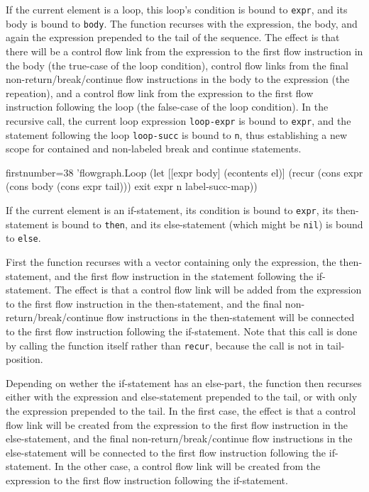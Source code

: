 \documentclass[11pt]{article}
\begin{document}
If the current element is a loop, this loop's condition is bound to
\verb|expr|, and its body is bound to \verb|body|.  The function recurses with
the expression, the body, and again the expression prepended to the tail of the
sequence.  The effect is that there will be a control flow link from the
expression to the first flow instruction in the body (the true-case of the loop
condition), control flow links from the final non-return/break/continue flow
instructions in the body to the expression (the repeation), and a control flow
link from the expression to the first flow instruction following the loop (the
false-case of the loop condition).  In the recursive call, the current loop
expression \verb|loop-expr| is bound to \verb|expr|, and the statement
following the loop \verb|loop-succ| is bound to \verb|n|, thus establishing a
new scope for contained and non-labeled break and continue statements.

\begin{clojurecode*}{firstnumber=38}
        'flowgraph.Loop
                   (let [[expr body] (econtents el)]
                     (recur (cons expr (cons body (cons expr tail)))
                            exit expr n label-succ-map))
\end{clojurecode*}

If the current element is an if-statement, its condition is bound to
\verb|expr|, its then-statement is bound to \verb|then|, and its else-statement
(which might be \verb|nil|) is bound to \verb|else|.

First the function recurses with a vector containing only the expression, the
then-statement, and the first flow instruction in the statement following the
if-statement.  The effect is that a control flow link will be added from the
expression to the first flow instruction in the then-statement, and the final
non-return/break/continue flow instructions in the then-statement will be
connected to the first flow instruction following the if-statement.  Note that
this call is done by calling the function itself rather than \verb|recur|,
because the call is not in tail-position.

\begin{sloppypar}
  Depending on wether the if-statement has an else-part, the function then
  recurses either with the expression and else-statement prepended to the tail,
  or with only the expression prepended to the tail.  In the first case, the
  effect is that a control flow link will be created from the expression to the
  first flow instruction in the else-statement, and the final
  non-return/break/continue flow instructions in the else-statement will be
  connected to the first flow instruction following the if-statement.  In the
  other case, a control flow link will be created from the expression to the
  first flow instruction following the if-statement.
\end{sloppypar}
\end{document}
